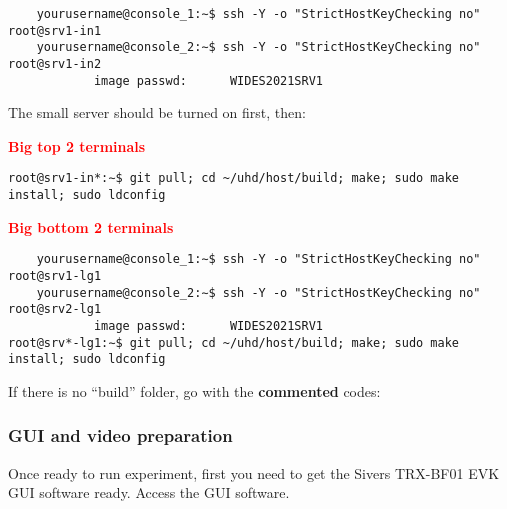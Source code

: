 \documentclass{article}
\begin{document}
        \begin{verbatim}
    yourusername@console_1:∼$ ssh -Y -o "StrictHostKeyChecking no" root@srv1-in1
    yourusername@console_2:∼$ ssh -Y -o "StrictHostKeyChecking no" root@srv1-in2
            image passwd:      WIDES2021SRV1
        \end{verbatim}
        
        The small server should be turned on first, then:
        
        \textbf{\textcolor{red}{Big top 2 terminals}}

        \begin{verbatim}
root@srv1-in*:∼$ git pull; cd ~/uhd/host/build; make; sudo make install; sudo ldconfig
        \end{verbatim}
        
        
        \textbf{\textcolor{red}{Big bottom 2 terminals}}

        \begin{verbatim}
    yourusername@console_1:∼$ ssh -Y -o "StrictHostKeyChecking no" root@srv1-lg1
    yourusername@console_2:∼$ ssh -Y -o "StrictHostKeyChecking no" root@srv2-lg1
            image passwd:      WIDES2021SRV1
root@srv*-lg1:∼$ git pull; cd ~/uhd/host/build; make; sudo make install; sudo ldconfig
        \end{verbatim}
        
        
        
        

        
        
        
        
        If there is no ``build'' folder, go with the \textbf{commented} codes:

        
        
        
    
        
        \subsubsection{GUI and video preparation}
        Once ready to run experiment, first you need to get the Sivers TRX-BF01 EVK GUI software ready. Access the GUI software.
        
\end{document}
